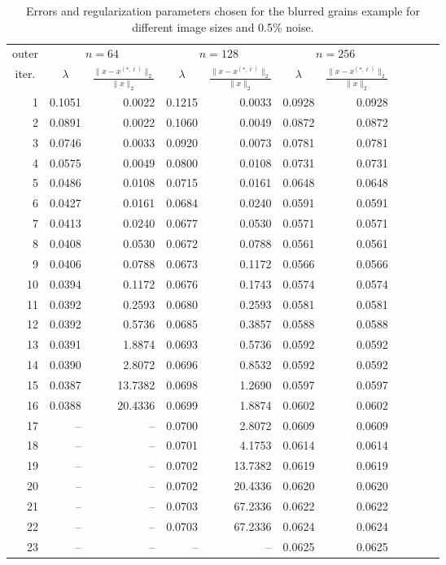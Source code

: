 \begin{table}[htp]
\caption{Errors and regularization parameters chosen for the blurred grains example for different image sizes and 0.5\% noise.}
\begin{center}
\begin{tabular}{|r|r|r|r|r|r|r|r|r|r|r|}
\hline
\multicolumn{1}{|c|}{outer} & \multicolumn{2}{c|}{$n = 64$} & \multicolumn{2}{c|}{$n = 128$} & \multicolumn{2}{c|}{$n = 256$} \\\cline{2-7}
\multicolumn{1}{|c|}{iter.} & \multicolumn{1}{c|}{$\lambda$} & \multicolumn{1}{c|}{$\frac{\|x - x^{(*,\ell)}\|_2}{\|x\|_2}$} & \multicolumn{1}{c|}{$\lambda$} & \multicolumn{1}{c|}{$\frac{\|x - x^{(*,\ell)}\|_2}{\|x\|_2}$}  & \multicolumn{1}{c|}{$\lambda$} & \multicolumn{1}{c|}{$\frac{\|x - x^{(*,\ell)}\|_2}{\|x\|_2}$} \\
\hline
1 & 0.1051 & 0.0022 & 0.1215 & 0.0033 & 0.0928 & 0.0928 \\
2 & 0.0891 & 0.0022 & 0.1060 & 0.0049 & 0.0872 & 0.0872 \\
3 & 0.0746 & 0.0033 & 0.0920 & 0.0073 & 0.0781 & 0.0781 \\
4 & 0.0575 & 0.0049 & 0.0800 & 0.0108 & 0.0731 & 0.0731 \\
5 & 0.0486 & 0.0108 & 0.0715 & 0.0161 & 0.0648 & 0.0648 \\
6 & 0.0427 & 0.0161 & 0.0684 & 0.0240 & 0.0591 & 0.0591 \\
7 & 0.0413 & 0.0240 & 0.0677 & 0.0530 & 0.0571 & 0.0571 \\
8 & 0.0408 & 0.0530 & 0.0672 & 0.0788 & 0.0561 & 0.0561 \\
9 & 0.0406 & 0.0788 & 0.0673 & 0.1172 & 0.0566 & 0.0566 \\
10 & 0.0394 & 0.1172 & 0.0676 & 0.1743 & 0.0574 & 0.0574 \\
11 & 0.0392 & 0.2593 & 0.0680 & 0.2593 & 0.0581 & 0.0581 \\
12 & 0.0392 & 0.5736 & 0.0685 & 0.3857 & 0.0588 & 0.0588 \\
13 & 0.0391 & 1.8874 & 0.0693 & 0.5736 & 0.0592 & 0.0592 \\
14 & 0.0390 & 2.8072 & 0.0696 & 0.8532 & 0.0592 & 0.0592 \\
15 & 0.0387 & 13.7382 & 0.0698 & 1.2690 & 0.0597 & 0.0597 \\
16 & 0.0388 & 20.4336 & 0.0699 & 1.8874 & 0.0602 & 0.0602 \\
17 & -- & -- & 0.0700 & 2.8072 & 0.0609 & 0.0609 \\
18 & -- & -- & 0.0701 & 4.1753 & 0.0614 & 0.0614 \\
19 & -- & -- & 0.0702 & 13.7382 & 0.0619 & 0.0619 \\
20 & -- & -- & 0.0702 & 20.4336 & 0.0620 & 0.0620 \\
21 & -- & -- & 0.0703 & 67.2336 & 0.0622 & 0.0622 \\
22 & -- & -- & 0.0703 & 67.2336 & 0.0624 & 0.0624 \\
23 & -- & -- & -- & -- & 0.0625 & 0.0625 \\
\hline
\end{tabular}
\end{center}
\label{tab:grains_blurring_errs_and_reg_params}
\end{table}%
